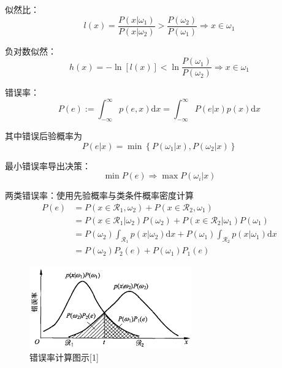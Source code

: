 \documentclass[openany]{ctexbook}
\theoremstyle{kaiti}
\theoremstyle{normal}
\begin{document}
似然比：
\begin{equation}
l(x)=\frac{P\left(x|\omega_1 \right)}{P\left(x|\omega_2 \right)} >\frac{P\left(\omega_2 \right)}{P\left(\omega_1 \right)} \Rightarrow x\in \omega_1
\end{equation}

负对数似然：
\begin{equation}
h(x)=-\ln \left[l(x)\right] <\ln \frac{P\left(\omega_1 \right)}{P\left(\omega_2 \right)} \Rightarrow x\in \omega_1
\end{equation}

错误率：
\begin{equation}
P\left(e \right):=\int_{-\infty}^{\infty}{p\left(e,x \right)\mathrm{d}x}=\int_{-\infty}^{\infty}{P\left(e|x \right)p(x)\mathrm{d}x}
\end{equation}

其中错误后验概率为 
\begin{equation}
P\left(e|x \right)=\min \left\{ P\left(\omega_1|x \right), P\left(\omega_2|x \right)\right\}
\end{equation}

最小错误率导出决策：
\begin{equation}
\min P\left(e \right)\Rightarrow \max P\left(\omega_i|x \right)
\end{equation}

两类错误率：使用先验概率与类条件概率密度计算
\begin{equation}
\begin{aligned}
  P\left(e \right)&=P\left(x\in \mathcal{R}_1,\omega_2 \right)+P\left(x\in \mathcal{R}_2,\omega_1 \right)\\
  &=P\left(x\in \mathcal{R}_1|\omega_2 \right)P\left(\omega_2 \right)+P\left(x\in \mathcal{R}_2|\omega_1 \right)P\left(\omega_1 \right)\\
  &=P\left(\omega_2 \right)\int_{\mathcal{R}_1}{p\left(x|\omega_2 \right)}\mathrm{d}x+P\left(\omega_1 \right)\int_{\mathcal{R}_2}{p\left(x|\omega_1 \right)}\mathrm{d}x\\
  &=P\left(\omega_2 \right)P_2\left(e \right)+P\left(\omega_1 \right)P_1\left(e \right)   
\end{aligned}
\end{equation}

\begin{figure}
  \centering
  \includegraphics[width=7cm]{1627807965262-1.2.png}
  \caption{错误率计算图示[1]}
\end{figure}
\end{document}
